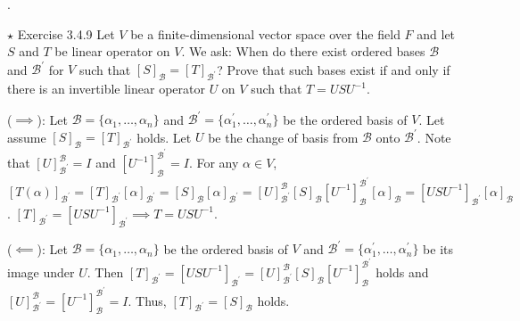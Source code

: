 \documentclass[8pt]{beamer}
\newcommand{\mc}[1]{\mathcal{#1}}
\begin{document}
\begin{frame}{.}
    \begin{block}{$\star$ Exercise 3.4.9}
        Let $V$ be a finite-dimensional vector space over the field $F$ and let $S$ and $T$ be linear operator on $V$. We ask: When do there exist ordered bases $\mc{B}$ and $\mc{B}^\prime$ for $V$ such that $[S]_{\mc{B}} = [T]_{\mc{B}^\prime}$?
        Prove that such bases exist if and only if there is an invertible linear operator $U$ on $V$ such that $T = U S U^{-1}$.
    \end{block}
    
    ($\implies$): Let $\mc{B} = \{\alpha_1, \dots, \alpha_n\}$ and $\mc{B}^\prime = \{\alpha_1^\prime, \dots, \alpha_n^\prime\}$ be the ordered basis of $V$.
    Let assume $[S]_{\mc{B}} = [T]_{\mc{B}^\prime}$ holds.
    Let $U$ be the change of basis from $\mc{B}$ onto $\mc{B}^\prime$.
    Note that $[U]_{\mc{B}^\prime}^{\mc{B}} = I$ and $[U^{-1}]_{\mc{B}}^{\mc{B}^\prime}=I$.
    For any $\alpha \in V$, $[T(\alpha)]_{\mc{B}^\prime} = [T]_{\mc{B}^\prime}[\alpha]_{\mc{B}^\prime} = [S]_{\mc{B}}[\alpha]_{\mc{B}^\prime} = [U]^{\mc{B}}_{\mc{B}^\prime} [S]_{\mc{B}} [U^{-1}]_{\mc{B}}^{\mc{B}^\prime} [\alpha]_{\mc{B}} = [U S U^{-1}]_{\mc{B}^\prime} [\alpha]_{\mc{B}}$.
    $[T]_{\mc{B}^\prime} = [U S U^{-1}]_{\mc{B}^\prime} \implies T = U S U^{-1}$.





    ($\impliedby$): Let $\mc{B} = \{\alpha_1, \dots , \alpha_n\}$ be the ordered basis of $V$ and $\mc{B}^\prime = \{\alpha_1^\prime, \dots, \alpha_n^\prime\}$ be its image under $U$. Then $[T]_{\mc{B^\prime}} = [USU^{-1}]_{\mc{B}^\prime} = [U]_{\mc{B}^\prime}^{\mc{B}} [S]_{\mc{B}} [U^{-1}]_{\mc{B}}^{\mc{B}^\prime}$ holds and $[U]^{\mc{B}}_{\mc{B}^\prime} =[U^{-1}]^{\mc{B}^\prime}_{\mc{B}}= I$. Thus, $[T]_{\mc{B}^\prime} = [S]_{\mc{B}}$ holds.
\end{frame}
\end{document}
